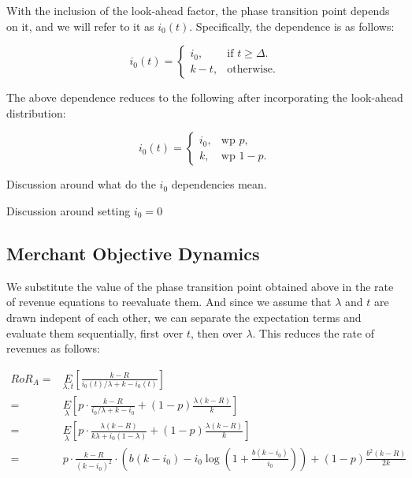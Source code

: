 With the inclusion of the look-ahead factor, the phase transition point depends on it, and we will refer to it as $i_0(t)$. Specifically, the dependence is as follows:

\begin{equation*}
  i_0(t)=\begin{cases}
    i_0, & \text{if $t \geq \Delta$}.\\
    k-t, & \text{otherwise}.
  \end{cases}
\end{equation*}

The above dependence reduces to the following after incorporating the look-ahead distribution:

\begin{equation*}
  i_0(t)=\begin{cases}
    i_0, & \text{wp } p,\\
    k, & \text{wp } 1-p.
  \end{cases}
\end{equation*}

{\arpit Discussion around what do the $i_0$ dependencies mean.}

{\arpit Discussion around setting $i_0 = 0$}

\subsection{Merchant Objective Dynamics}
We substitute the value of the phase transition point obtained above in the rate of revenue equations to reevaluate them. 
And since we assume that $\lambda$ and $t$ are drawn indepent of each other, we can separate the expectation terms and evaluate them sequentially, first over $t$, then over $\lambda$. This reduces the rate of revenues as follows:

\begin{align*}
RoR_A =& \underset{\lambda, t}E\left[\frac{k-R}{i_0(t)/\lambda + k - i_0(t)}\right]\\
                                       =& \underset{\lambda}E\left[p\cdot\frac{k-R}{i_0/\lambda + k - i_0} + (1-p)\frac{\lambda(k-R)}{k}\right]\\
                                       =& \underset{\lambda}E\left[p\cdot\frac{\lambda(k-R)}{k\lambda + i_0(1-\lambda)} + (1-p)\frac{\lambda(k-R)}{k}\right]\\
                                       =& p\cdot\frac{k-R}{(k-i_0)^2}\cdot\left(b(k-i_0) - i_0 \log\left(1 + \frac{b(k-i_0)}{i_0}\right)\right) + (1-p)\frac{b^2(k-R)}{2k}
\end{align*}

